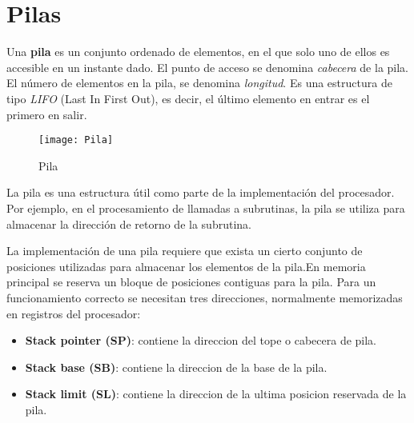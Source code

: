 \section{Pilas}

Una \textbf{pila} es un conjunto ordenado de elementos, en el que solo uno de ellos es accesible en un instante dado. El punto de acceso se denomina \textit{cabecera} de la pila. El número de elementos en la pila, se denomina \textit{longitud}. Es una estructura de tipo \textit{LIFO} (Last In First Out), es decir, el último elemento en entrar es el primero en salir.

\begin{figure}[h]
  \centering
  \texttt{[image: Pila]}
  \caption{Pila}
\end{figure}

La pila es una estructura útil como parte de la implementación del procesador. Por ejemplo, en el procesamiento de llamadas a subrutinas, la pila se utiliza para almacenar la dirección de retorno de la subrutina.

La implementación de una pila requiere que exista un cierto conjunto de posiciones utilizadas para almacenar los elementos de la pila.En memoria principal se reserva un bloque de posiciones contiguas para la pila.
Para un funcionamiento correcto se necesitan tres direcciones, normalmente memorizadas en registros del procesador:

\begin{itemize}
  \item \textbf{Stack pointer (SP)}: contiene la direccion del tope o cabecera de pila.
  \item \textbf{Stack base (SB)}: contiene la direccion de la base de la pila.
  \item \textbf{Stack limit (SL)}: contiene la direccion de la ultima posicion reservada de la pila.
\end{itemize}